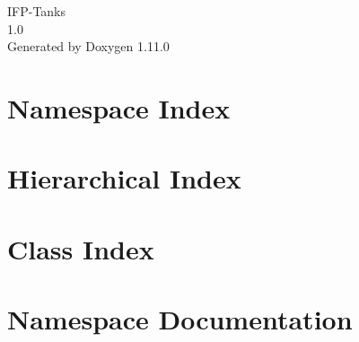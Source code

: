 \documentclass[twoside]{book}
\newcommand{\+}{\discretionary{\mbox{\scriptsize$\hookleftarrow$}}{}{}}
\newcommand{\clearemptydoublepage}{%
    \newpage{\pagestyle{empty}\cleardoublepage}%
  }
\begin{document}
  \raggedbottom
    \hypersetup{pageanchor=false,
                bookmarksnumbered=true,
                pdfencoding=unicode
               }
  \begin{titlepage}
  \vspace*{7cm}
  \begin{center}%
  {\Large IFP-\/\+Tanks}\\
  [1ex]\large 1.\+0 \\
  \vspace*{1cm}
  {\large Generated by Doxygen 1.11.0}\\
  \end{center}
  \end{titlepage}
  \clearemptydoublepage
  \tableofcontents
  \clearemptydoublepage
  \hypersetup{pageanchor=true}
\chapter{Namespace Index}

\chapter{Hierarchical Index}

\chapter{Class Index}

\chapter{Namespace Documentation}













\end{document}
